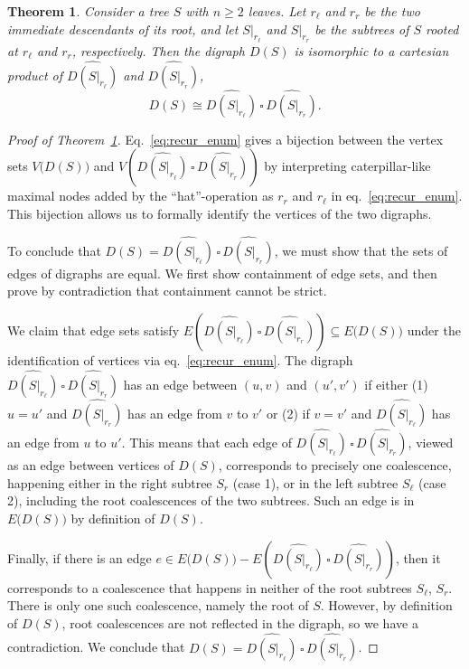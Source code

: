 \documentclass[10pt,a4paper]{amsart}
\newtheorem{theorem}{Theorem}
\newcommand*{\cp}[2]{#1 \,\square\, #2}
\begin{document}
\begin{theorem}\label{thm:graph_decomp}
Consider a tree $S$ with $n\geq 2$ leaves. Let $r_\ell$ and $r_r$ be the two immediate descendants of its root, and let $S|_{r_\ell}$ and $S|_{r_r}$ be the subtrees of $S$ rooted at $r_\ell$ and $r_r$, respectively. Then the digraph $D(S)$ is isomorphic to a cartesian product of $\widehat{D(S|_{r_\ell})}$ and $\widehat{D(S|_{r_r})}$,
\[
	D(S) \cong \cp{\widehat{D(S|_{r_\ell})}}{\widehat{D(S|_{r_r})}}.
\]
\end{theorem}

\begin{proof}[Proof of Theorem~\ref{thm:graph_decomp}]
Eq.~\ref{eq:recur_enum} gives a bijection between the vertex sets $V\big(D(S)\big)$ and $V\left(\cp{\widehat{D(S|_{r_\ell})}}{\widehat{D(S|_{r_r})}}\right)$ by interpreting caterpillar-like maximal nodes added by the ``hat''-operation as $r_r$ and $r_\ell$ in eq.~\ref{eq:recur_enum}. This bijection allows us to formally identify the vertices of the two digraphs.

To conclude that $D(S) = \cp{\widehat{D(S|_{r_\ell})}}{\widehat{D(S|_{r_r})}}$, we must show that the sets of edges of digraphs are equal. We first show containment of edge sets, and then prove by contradiction that containment cannot be strict.

We claim that edge sets satisfy $E\left(\cp{\widehat{D(S|_{r_\ell})}}{\widehat{D(S|_{r_r})}}\right) \subseteq E\big(D(S)\big)$ under the identification of vertices via eq.~\ref{eq:recur_enum}. The digraph $\cp{\widehat{D(S|_{r_\ell})}}{\widehat{D(S|_{r_r})}}$ has an edge between $(u,v)$ and $(u',v')$ if either (1) $u=u'$ and $\widehat{D(S|_{r_r})}$ has an edge from $v$ to $v'$ or (2) if $v = v'$ and $\widehat{D(S|_{r_\ell})}$ has an edge from $u$ to $u'$. This means that each edge of $\cp{\widehat{D(S|_{r_\ell})}}{\widehat{D(S|_{r_r})}}$, viewed as an edge between vertices of $D(S)$, corresponds to precisely one coalescence, happening either in the right subtree $S_r$ (case 1), or in the left subtree $S_\ell$ (case 2), including the root coalescences of the two subtrees. Such an edge is in $E\big(D(S) \big)$ by definition of $D(S)$.

Finally, if there is an edge $e \in E\big(D(S)\big) - E\left(\cp{\widehat{D(S|_{r_\ell})}}{\widehat{D(S|_{r_r})}}\right)$, then it corresponds to a coalescence that happens in neither of the root subtrees $S_\ell$, $S_r$. There is only one such coalescence, namely the root of $S$. However, by definition of $D(S)$, root coalescences are not reflected in the digraph, so we have a contradiction. We conclude that $D(S) = \cp{\widehat{D(S|_{r_\ell})}}{\widehat{D(S|_{r_r})}}$.
\end{proof}
\end{document}
